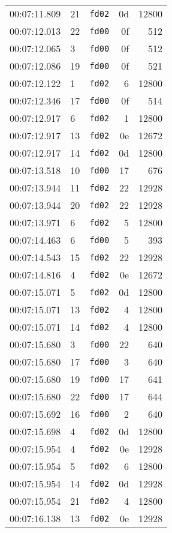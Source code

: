 \documentclass{article}
\begin{document}
\begin{longtable}{lllrr}
00:07:11.809 & 21 & \texttt{fd02} & 0d & 12800 \\
00:07:12.013 & 22 & \texttt{fd00} & 0f & 512 \\
00:07:12.065 & 3 & \texttt{fd00} & 0f & 512 \\
00:07:12.086 & 19 & \texttt{fd00} & 0f & 521 \\
00:07:12.122 & 1 & \texttt{fd02} & 6 & 12800 \\
00:07:12.346 & 17 & \texttt{fd00} & 0f & 514 \\
00:07:12.917 & 6 & \texttt{fd02} & 1 & 12800 \\
00:07:12.917 & 13 & \texttt{fd02} & 0e & 12672 \\
00:07:12.917 & 14 & \texttt{fd02} & 0d & 12800 \\
00:07:13.518 & 10 & \texttt{fd00} & 17 & 676 \\
00:07:13.944 & 11 & \texttt{fd02} & 22 & 12928 \\
00:07:13.944 & 20 & \texttt{fd02} & 22 & 12928 \\
00:07:13.971 & 6 & \texttt{fd02} & 5 & 12800 \\
00:07:14.463 & 6 & \texttt{fd00} & 5 & 393 \\
00:07:14.543 & 15 & \texttt{fd02} & 22 & 12928 \\
00:07:14.816 & 4 & \texttt{fd02} & 0e & 12672 \\
00:07:15.071 & 5 & \texttt{fd02} & 0d & 12800 \\
00:07:15.071 & 13 & \texttt{fd02} & 4 & 12800 \\
00:07:15.071 & 14 & \texttt{fd02} & 4 & 12800 \\
00:07:15.680 & 3 & \texttt{fd00} & 22 & 640 \\
00:07:15.680 & 17 & \texttt{fd00} & 3 & 640 \\
00:07:15.680 & 19 & \texttt{fd00} & 17 & 641 \\
00:07:15.680 & 22 & \texttt{fd00} & 17 & 644 \\
00:07:15.692 & 16 & \texttt{fd00} & 2 & 640 \\
00:07:15.698 & 4 & \texttt{fd02} & 0d & 12800 \\
00:07:15.954 & 4 & \texttt{fd02} & 0e & 12928 \\
00:07:15.954 & 5 & \texttt{fd02} & 6 & 12800 \\
00:07:15.954 & 14 & \texttt{fd02} & 0d & 12928 \\
00:07:15.954 & 21 & \texttt{fd02} & 4 & 12800 \\
00:07:16.138 & 13 & \texttt{fd02} & 0e & 12928 \\

\end{longtable}
\end{document}
